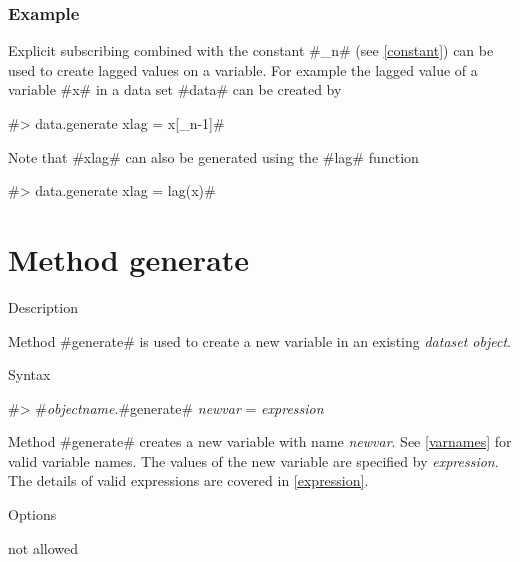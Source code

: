 \subsubsection*{Example}

Explicit subscribing combined with the constant #_n# (see
\autoref{constant}) can be used to create lagged values
on a variable. For example the lagged value of a variable #x# in a data set #data# can be created by

#> data.generate xlag = x[_n-1]#

Note that #xlag# can also be generated using the #lag# function

#> data.generate xlag = lag(x)#


\clearpage

\section{Method generate}
\label{generate} 

\begin{stanza}{Description}

Method #generate# is used to create a new variable in an existing
{\em dataset object}.
\end{stanza}


\begin{stanza}{Syntax}

{#> #{\em objectname}.#generate# {\em newvar} = {\em expression}

Method #generate# creates a new variable with name {\em newvar}.
See \autoref{varnames} for valid variable names. The values of the
new variable are specified by {\em expression}. The details of
valid expressions are covered in \autoref{expression}.}
\end{stanza}


\begin{stanza}{Options}

{not allowed}
\end{stanza}


